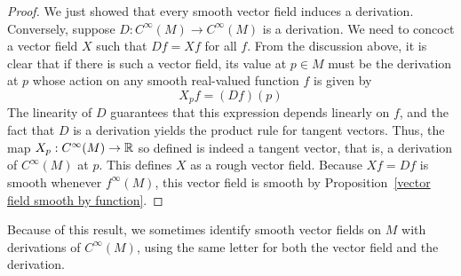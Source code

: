 \begin{proof}
We just showed that every smooth vector field induces a derivation. Conversely, suppose $D:C^\infty(M)\to C^\infty(M)$ is a derivation. We need to concoct a vector field $X$ such that $Df=Xf$ for all $f$. From the discussion above, it is clear that if there is such a vector field, its value at $p\in M$ must be the derivation at $p$ whose action on any smooth real-valued function $f$ is given by
\[X_pf=(Df)(p)\]
The linearity of $D$ guarantees that this expression depends linearly on $f$, and the fact that $D$ is a derivation yields the product rule for tangent vectors. Thus, the map $X_p:C^\infty(M)\to\mathbb{R}$ so defined is indeed a tangent vector, that is, a derivation of $C^\infty(M)$ at $p$. This defines $X$ as a rough vector field. Because $Xf=Df$ is smooth whenever $f^\infty(M)$, this vector field is smooth by Proposition~\ref{vector field smooth by function}.
\end{proof}
Because of this result, we sometimes identify smooth vector fields on $M$ with derivations of $C^\infty(M)$, using the same letter for both the vector field and the derivation.
